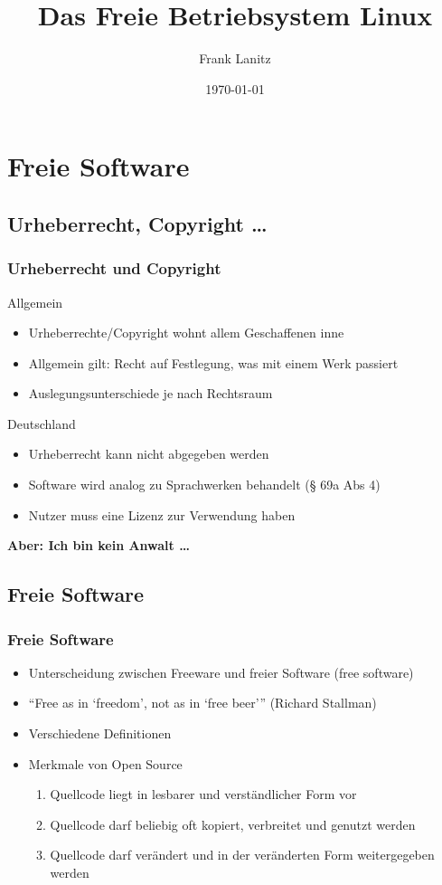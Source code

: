 \documentclass[compress]{beamer}
\title{Das Freie Betriebsystem Linux}
\author{Frank Lanitz}
\date{\today}
\begin{document}
\frame{\titlepage}
\begin{frame}
	\tableofcontents{}
\end{frame}

\section{Freie Software}
\subsection{Urheberrecht, Copyright \dots}

\begin{frame}
	\frametitle{Urheberrecht und Copyright}
	\begin{block}{Allgemein}
		\begin{itemize}
			\item Urheberrechte/Copyright wohnt allem Geschaffenen inne
			\item Allgemein gilt: Recht auf Festlegung, was mit einem Werk 
				passiert
			\item Auslegungsunterschiede je nach Rechtsraum
		\end{itemize}
	\end{block}
	\pause
	\begin{block}{Deutschland}
		\begin{itemize}
			\item Urheberrecht kann nicht abgegeben werden
			\item Software wird analog zu Sprachwerken behandelt (§ 69a Abs 4)
			\item Nutzer muss eine Lizenz zur Verwendung haben
		\end{itemize}
	\end{block}
	\pause
	\textbf{Aber: Ich bin kein Anwalt \dots}
\end{frame}

\subsection{Freie Software}
\begin{frame}
	\frametitle{Freie Software}
	\begin{block}{}
		\begin{itemize}
			\item Unterscheidung zwischen Freeware und freier 
				Software (free software)
			\item “Free as in ‘freedom’, not as in ‘free beer’”
				(Richard Stallman)
			\item Verschiedene Definitionen 
			\item Merkmale von Open Source
			\begin{enumerate}
				\item Quellcode liegt in lesbarer und verständlicher Form vor
				\item Quellcode darf beliebig oft kopiert, verbreitet und 
					genutzt werden
				\item Quellcode darf verändert und in der veränderten Form 
					weitergegeben werden
			\end{enumerate}
		\end{itemize}
	\end{block}
\end{frame}
\end{document}
